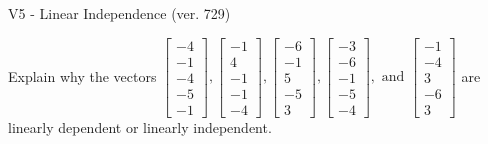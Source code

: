 \begin{exercise}
  \begin{exerciseTitle}V5 - Linear Independence (ver. 729)\end{exerciseTitle}
  \begin{exerciseStatement}
    Explain why the vectors \(\left[\begin{array}{r}
-4 \\
-1 \\
-4 \\
-5 \\
-1
\end{array}\right] , \left[\begin{array}{r}
-1 \\
4 \\
-1 \\
-1 \\
-4
\end{array}\right] , \left[\begin{array}{r}
-6 \\
-1 \\
5 \\
-5 \\
3
\end{array}\right] , \left[\begin{array}{r}
-3 \\
-6 \\
-1 \\
-5 \\
-4
\end{array}\right] , \text{ and } \left[\begin{array}{r}
-1 \\
-4 \\
3 \\
-6 \\
3
\end{array}\right]\) are linearly dependent or linearly independent.	



\end{exerciseStatement}
\end{exercise}
